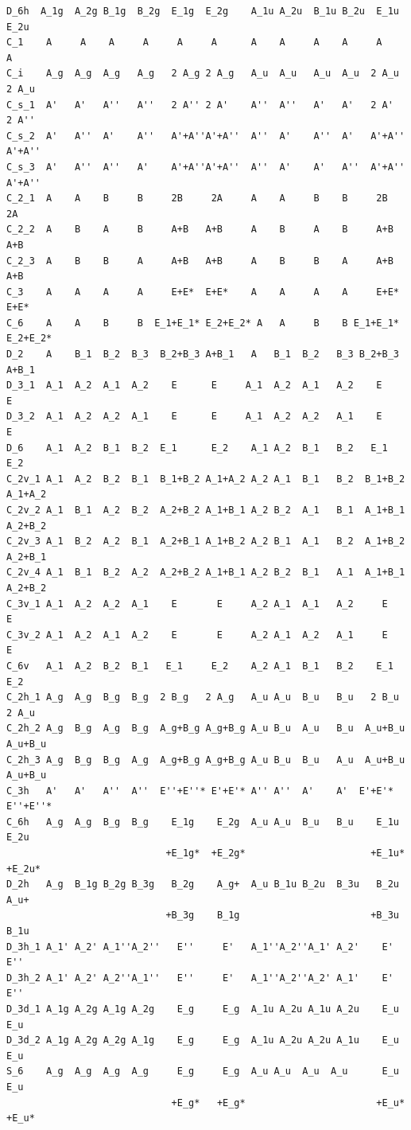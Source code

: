 \documentclass[12pt,a4paper]{article}
\begin{document}
\begin{verbatim}
D_6h  A_1g  A_2g B_1g  B_2g  E_1g  E_2g    A_1u A_2u  B_1u B_2u  E_1u  E_2u
C_1    A     A    A     A     A     A      A    A     A    A     A     A
C_i    A_g  A_g  A_g   A_g   2 A_g 2 A_g   A_u  A_u   A_u  A_u  2 A_u  2 A_u
C_s_1  A'   A'   A''   A''   2 A'' 2 A'    A''  A''   A'   A'   2 A'   2 A'' 
C_s_2  A'   A''  A'    A''   A'+A''A'+A''  A''  A'    A''  A'   A'+A'' A'+A''
C_s_3  A'   A''  A''   A'    A'+A''A'+A''  A''  A'    A'   A''  A'+A'' A'+A'' 
C_2_1  A    A    B     B     2B     2A     A    A     B    B     2B     2A
C_2_2  A    B    A     B     A+B   A+B     A    B     A    B     A+B    A+B
C_2_3  A    B    B     A     A+B   A+B     A    B     B    A     A+B    A+B
C_3    A    A    A     A     E+E*  E+E*    A    A     A    A     E+E*   E+E*
C_6    A    A    B     B  E_1+E_1* E_2+E_2* A   A     B    B E_1+E_1* E_2+E_2*
D_2    A    B_1  B_2  B_3  B_2+B_3 A+B_1   A   B_1  B_2   B_3 B_2+B_3 A+B_1 
D_3_1  A_1  A_2  A_1  A_2    E      E     A_1  A_2  A_1   A_2    E      E
D_3_2  A_1  A_2  A_2  A_1    E      E     A_1  A_2  A_2   A_1    E      E
D_6    A_1  A_2  B_1  B_2  E_1      E_2    A_1 A_2  B_1   B_2   E_1    E_2
C_2v_1 A_1  A_2  B_2  B_1  B_1+B_2 A_1+A_2 A_2 A_1  B_1   B_2  B_1+B_2 A_1+A_2
C_2v_2 A_1  B_1  A_2  B_2  A_2+B_2 A_1+B_1 A_2 B_2  A_1   B_1  A_1+B_1 A_2+B_2
C_2v_3 A_1  B_2  A_2  B_1  A_2+B_1 A_1+B_2 A_2 B_1  A_1   B_2  A_1+B_2 A_2+B_1
C_2v_4 A_1  B_1  B_2  A_2  A_2+B_2 A_1+B_1 A_2 B_2  B_1   A_1  A_1+B_1 A_2+B_2
C_3v_1 A_1  A_2  A_2  A_1    E       E     A_2 A_1  A_1   A_2     E      E
C_3v_2 A_1  A_2  A_1  A_2    E       E     A_2 A_1  A_2   A_1     E      E
C_6v   A_1  A_2  B_2  B_1   E_1     E_2    A_2 A_1  B_1   B_2    E_1    E_2
C_2h_1 A_g  A_g  B_g  B_g  2 B_g   2 A_g   A_u A_u  B_u   B_u   2 B_u  2 A_u 
C_2h_2 A_g  B_g  A_g  B_g  A_g+B_g A_g+B_g A_u B_u  A_u   B_u  A_u+B_u A_u+B_u
C_2h_3 A_g  B_g  B_g  A_g  A_g+B_g A_g+B_g A_u B_u  B_u   A_u  A_u+B_u A_u+B_u
C_3h   A'   A'   A''  A''  E''+E''* E'+E'* A'' A''  A'    A'  E'+E'* E''+E''*
C_6h   A_g  A_g  B_g  B_g    E_1g    E_2g  A_u A_u  B_u   B_u    E_1u    E_2u
                            +E_1g*  +E_2g*                      +E_1u*  +E_2u*
D_2h   A_g  B_1g B_2g B_3g   B_2g    A_g+  A_u B_1u B_2u  B_3u   B_2u    A_u+
                            +B_3g    B_1g                       +B_3u    B_1u
D_3h_1 A_1' A_2' A_1''A_2''   E''     E'   A_1''A_2''A_1' A_2'    E'     E''
D_3h_2 A_1' A_2' A_2''A_1''   E''     E'   A_1''A_2''A_2' A_1'    E'     E''
D_3d_1 A_1g A_2g A_1g A_2g    E_g     E_g  A_1u A_2u A_1u A_2u    E_u    E_u
D_3d_2 A_1g A_2g A_2g A_1g    E_g     E_g  A_1u A_2u A_2u A_1u    E_u    E_u
S_6    A_g  A_g  A_g  A_g     E_g     E_g  A_u A_u  A_u  A_u      E_u    E_u
                             +E_g*   +E_g*                       +E_u*  +E_u*
\end{verbatim}
\end{document}

